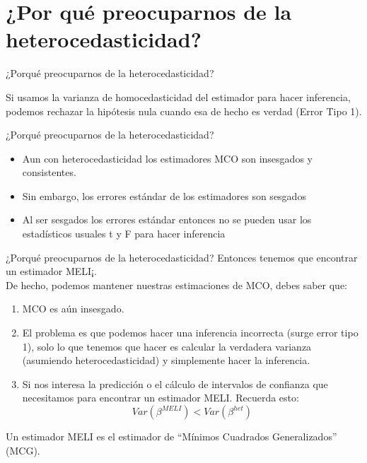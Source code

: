 \section[¿Problema?]{¿Por qué preocuparnos de la heterocedasticidad?}

\begin{frame}{¿Porqué preocuparnos de la heterocedasticidad?}
		\begin{center}
			
		\end{center}
	Si usamos la varianza de homocedasticidad del estimador para hacer inferencia, podemos rechazar la hipótesis nula cuando esa de hecho es verdad (Error Tipo 1).
\end{frame}
\begin{frame}{¿Porqué preocuparnos de la heterocedasticidad?}
	\begin{itemize}
		\item Aun con heterocedasticidad los estimadores MCO son insesgados y consistentes.
		\pause
		\item Sin embargo, los errores estándar de los estimadores son sesgados
		\pause
		\item Al ser sesgados los errores estándar entonces no se pueden usar los estadísticos usuales t y F para hacer inferencia
	\end{itemize}
\end{frame}
\begin{frame}{¿Porqué preocuparnos de la heterocedasticidad?}
	Entonces tenemos que encontrar un estimador MELI¡.\\
	De hecho, podemos mantener nuestras estimaciones de MCO, debes saber que:	
	\begin{enumerate}
		\item MCO es aún insesgado.
		\item El problema es que podemos hacer una inferencia incorrecta (surge error tipo 1), solo lo que tenemos que hacer es calcular la verdadera varianza (asumiendo heterocedasticidad) y simplemente hacer la inferencia.
		\item Si nos interesa la predicción o el cálculo de intervalos de confianza que necesitamos para encontrar un estimador MELI. Recuerda esto:
			$$Var(\beta^{MELI})<Var(\beta^{het})$$
	\end{enumerate}
	Un estimador MELI es el estimador de ``Mínimos Cuadrados Generalizados'' (MCG).
\end{frame}